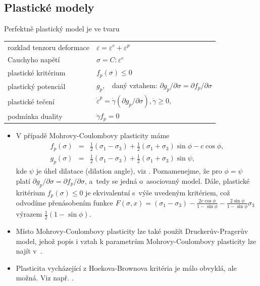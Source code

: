 \documentclass{article}
\newcommand{\alert}[1]{#1}
\begin{document}
\subsection{Plastické modely}
\alert{Perfektně} plastický model je ve tvaru
\begin{table}[ht]
	\centering
	\begin{tabular}{ll}
		\hline
		rozklad tenzoru deformace & $\varepsilon = \varepsilon^e + \varepsilon^p$\\
		Cauchyho napětí & $\sigma = C : \varepsilon^e$\\
		\alert{plastické kritérium} & \alert{$f_p(\sigma)\leq0$}\\
		plastický potenciál & $g_p,\;\;$ daný vztahem: $\partial g_p/\partial \sigma = \partial f_p/\partial \sigma$  \\
		plastické tečení & \alert{$\dot{\varepsilon}^p = \dot{\gamma}(\partial g_p/\partial \sigma), \dot\gamma \geq 0$,}\\
		podmínka duality & $\dot{\gamma} f_p =0$\\
		\hline
	\end{tabular}
\end{table}

\begin{itemize}
	\item V případě Mohrovy-Coulombovy plasticity máme
	\begin{eqnarray*}
		f_p(\sigma) &=& \frac{1}{2} (\sigma_1 - \sigma_3) + \frac{1}{2} (\sigma_1 + \sigma_3)\sin \phi - c \cos \phi, \\
		g_p(\sigma) &=& \frac{1}{2} (\sigma_1 - \sigma_3) + \frac{1}{2} (\sigma_1 + \sigma_3)\sin \psi,
	\end{eqnarray*}
	\alert{kde $\psi$ je úhel dilatace (dilation angle), viz \cite{Neto2011}. Poznamenejme, že pro $\phi = \psi$ platí $\partial g_p/\partial \sigma = \partial f_p/\partial \sigma$, a~tedy se jedná o~asociovaný model. Dále, plastické kritérium $f_p(\sigma)\leq0$ je ekvivalentní s~výše uvedeným kritériem, což odvodíme přenásobením funkce
	$F(\sigma, x) = (\sigma_1 - \sigma_3) - \frac{2c\cos \phi}{1-\sin \phi} - \frac{2\sin \phi}{1-\sin \phi} \sigma_3$ výrazem $\frac{1}{2}(1 - \sin \phi)$.}
	\item Místo Mohrovy-Coulombovy plasticity lze také použít Druckerův-Pragerův model, jehož popis i vztah k parametrům Mohrovy-Coulombovy plasticity lze najít v~\cite{Neto2011}. 
	\item Plasticita vycházející z Hoekova-Brownova kritéria je málo obvyklá, ale možná. Viz např. \cite{Carranza-Torres1999}.
\end{itemize}
\end{document}
